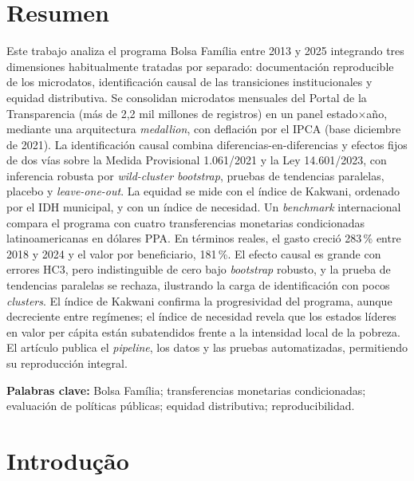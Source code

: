 \documentclass[12pt,a4paper,oneside]{article}
\begin{document}
\section*{Resumen}
\begin{singlespace}\small\noindent
Este trabajo analiza el programa Bolsa Família entre 2013 y 2025 integrando tres dimensiones habitualmente tratadas por separado: documentación reproducible de los microdatos, identificación causal de las transiciones institucionales y equidad distributiva. Se consolidan microdatos mensuales del Portal de la Transparencia (más de 2,2 mil millones de registros) en un panel estado$\times$año, mediante una arquitectura \textit{medallion}, con deflación por el IPCA (base diciembre de 2021). La identificación causal combina diferencias-en-diferencias y efectos fijos de dos vías sobre la Medida Provisional 1.061/2021 y la Ley 14.601/2023, con inferencia robusta por \textit{wild-cluster bootstrap}, pruebas de tendencias paralelas, placebo y \textit{leave-one-out}. La equidad se mide con el índice de Kakwani, ordenado por el IDH municipal, y con un índice de necesidad. Un \textit{benchmark} internacional compara el programa con cuatro transferencias monetarias condicionadas latinoamericanas en dólares PPA. En términos reales, el gasto creció 283\,\% entre 2018 y 2024 y el valor por beneficiario, 181\,\%. El efecto causal es grande con errores HC3, pero indistinguible de cero bajo \textit{bootstrap} robusto, y la prueba de tendencias paralelas se rechaza, ilustrando la carga de identificación con pocos \textit{clusters}. El índice de Kakwani confirma la progresividad del programa, aunque decreciente entre regímenes; el índice de necesidad revela que los estados líderes en valor per cápita están subatendidos frente a la intensidad local de la pobreza. El artículo publica el \textit{pipeline}, los datos y las pruebas automatizadas, permitiendo su reproducción integral.

\vspace{6pt}\noindent\textbf{Palabras clave:} Bolsa Família; transferencias monetarias condicionadas; evaluación de políticas públicas; equidad distributiva; reproducibilidad.
\end{singlespace}

\clearpage

\section{Introdução}\label{sec:intro}
\end{document}
